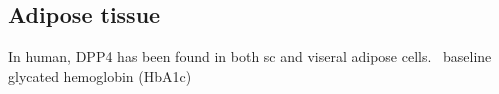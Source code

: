 \subsection{Adipose tissue}
In human, DPP4 has been found in both sc and viseral adipose cells.~\cite{Lamers2011} baseline glycated hemoglobin (HbA1c) 